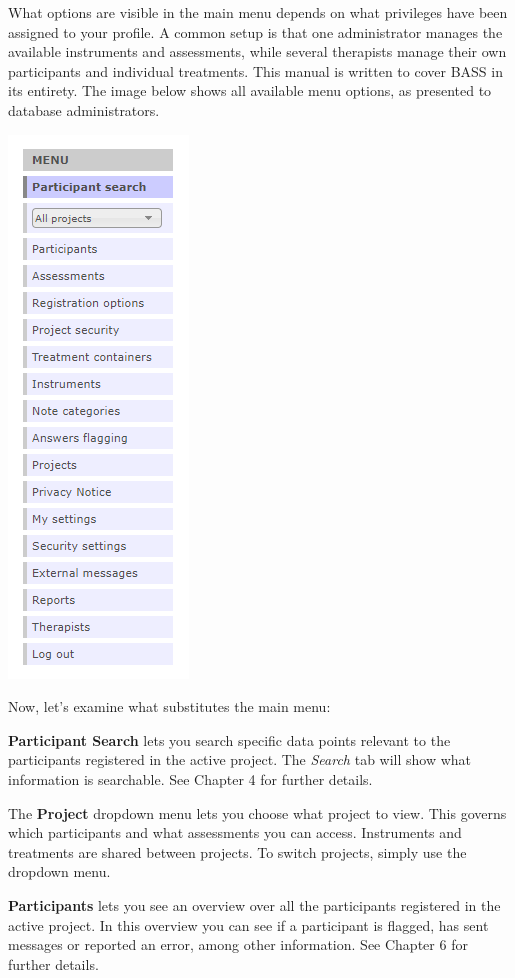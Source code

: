 \documentclass[]{book}
\begin{document}
What options are visible in the main menu depends on what privileges have been assigned to your profile. A common setup is that one administrator manages the available instruments and assessments, while several therapists manage their own participants and individual treatments. This manual is written to cover BASS in its entirety. The image below shows all available menu options, as presented to database administrators.

\includegraphics{images/main-menu.png}

Now, let's examine what substitutes the main menu:

\textbf{Participant Search} lets you search specific data points relevant to the participants registered in the active project. The \emph{Search} tab will show what information is searchable. See Chapter 4 for further details.

The \textbf{Project} dropdown menu lets you choose what project to view. This governs which participants and what assessments you can access. Instruments and treatments are shared between projects. To switch projects, simply use the dropdown menu.

\textbf{Participants} lets you see an overview over all the participants registered in the active project. In this overview you can see if a participant is flagged, has sent messages or reported an error, among other information. See Chapter 6 for further details.
\end{document}
